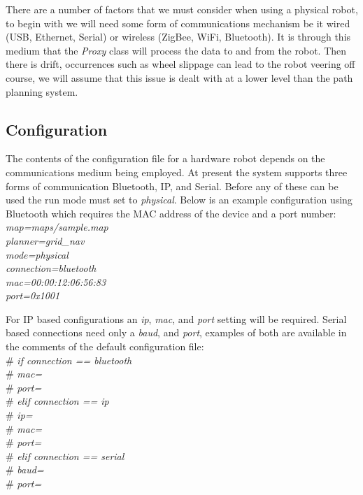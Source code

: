 \noindent
There are a number of factors that we must consider when using a physical robot, to begin with we will need some form of communications mechanism be it wired (USB, Ethernet, Serial) or wireless (ZigBee, WiFi, Bluetooth). It is through this medium that the \textit{Proxy} class will process the data to and from the robot. Then there is drift, occurrences such as wheel slippage can lead to the robot veering off course, we will assume that this issue is dealt with at a lower level than the path planning system.

\subsection{Configuration}
\noindent
The contents of the configuration file for a hardware robot depends on the communications medium being employed. At present the system supports three forms of communication Bluetooth, IP, and Serial. Before any of these can be used the run mode must set to \textit{physical}. Below is an example configuration using Bluetooth which requires the MAC address of the device and a port number: \\

	\indent \textit{map=maps/sample.map\\}
	\indent \textit{planner=grid\_nav\\}
	\indent \textit{mode=physical\\}
	\indent \textit{connection=bluetooth\\}
	\indent \textit{mac=00:00:12:06:56:83\\}
	\indent \textit{port=0x1001\\}
	
\noindent 
For IP based configurations an \textit{ip}, \textit{mac}, and \textit{port} setting will be required. Serial based connections need only a \textit{baud}, and \textit{port}, examples of both are available in the comments of the default configuration file: \\

	\indent \#   	\textit{if connection == bluetooth\\}
	\indent \#		\indent \textit{mac=\\}
	\indent \#      \indent \textit{port=\\}
	\indent \#   	\textit{elif connection == ip\\}
	\indent \#      \indent \textit{ip=\\}
	\indent \#      \indent \textit{mac=\\}
	\indent \#      \indent \textit{port=\\}
	\indent \#   	\textit{elif connection == serial\\}
	\indent \#      \indent \textit{baud=\\}
	\indent \#      \indent \textit{port=}

